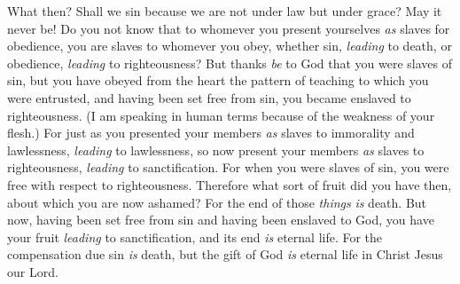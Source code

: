 \begin{biblechapter}
 What then? Shall we sin because we are not under law but under grace? May it never be!
\verse Do you not know that to whomever you present yourselves \textit{as} slaves for obedience, you are slaves to whomever you obey, whether sin, \textit{leading} to death, or obedience, \textit{leading} to righteousness?
\verse But thanks \textit{be} to God that you were slaves of sin, but you have obeyed from the heart the pattern of teaching to which you were entrusted,
\verse and having been set free from sin, you became enslaved to righteousness.
\verse (I am speaking in human terms because of the weakness of your flesh.) For just as you presented your members \textit{as} slaves to immorality and lawlessness, \textit{leading} to lawlessness, so now present your members \textit{as} slaves to righteousness, \textit{leading} to sanctification.
\verse For when you were slaves of sin, you were free with respect to righteousness.
\verse Therefore what sort of fruit did you have then, about which you are now ashamed? For the end of those \textit{things} \textit{is} death.
\verse But now, having been set free from sin and having been enslaved to God, you have your fruit \textit{leading} to sanctification, and its end \textit{is} eternal life.
\verse For the compensation due sin \textit{is} death, but the gift of God \textit{is} eternal life in Christ Jesus our Lord.
\end{biblechapter}

